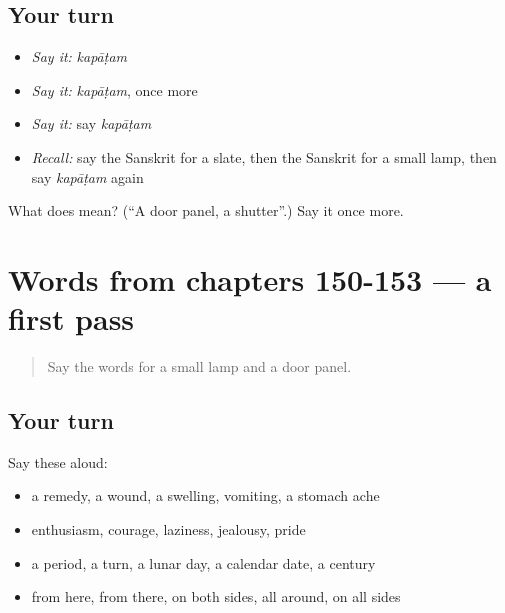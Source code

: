 \subsection*{Your turn}
\begin{itemize}
\raggedright
  \item \emph{Say it:} \emph{kapāṭam}
  \item \emph{Say it:} \emph{kapāṭam}, once more
  \item \emph{Say it:} say \emph{kapāṭam}
  \item \emph{Recall:} say the Sanskrit for a slate, then the Sanskrit for a small lamp, then say \emph{kapāṭam} again
\end{itemize}

\begin{tcolorbox}[breakable,colback=teal!4,colframe=teal!35!black,title={Before you move on}]
What does  mean? (\textquotedblleft{}A door panel, a shutter\textquotedblright{}.) Say it once more.
\end{tcolorbox}
\section[(dialogue)]{Words from chapters 150-153 — a first pass}

\label{lesson:SA-R158-first-pass-words-from-chapters-150-153}



\begin{quote}
Say the words for a small lamp and a door panel.
\end{quote}

\subsection*{Your turn}
Say these aloud:

\begin{itemize}
\raggedright
  \item a remedy, a wound, a swelling, vomiting, a stomach ache
  \item enthusiasm, courage, laziness, jealousy, pride
  \item a period, a turn, a lunar day, a calendar date, a century
  \item from here, from there, on both sides, all around, on all sides
\end{itemize}

